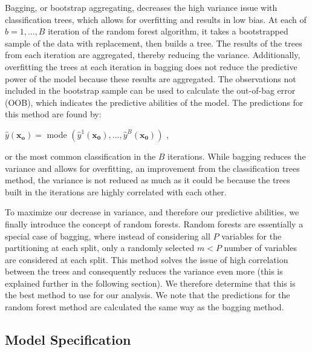 \documentclass{svproc}
\begin{document}
Bagging, or bootstrap aggregating, decreases the high variance issue with classification trees, which allows for overfitting and results in low bias. At each of $b=1,...,B$ iteration of the random forest algorithm, it takes a bootstrapped sample of the data with replacement, then builds a tree. The results of the trees from each iteration are aggregated, thereby reducing the variance. Additionally, overfitting the trees at each iteration in bagging does not reduce the predictive power of the model because these results are aggregated. The observations not included in the bootstrap sample can be used to calculate the out-of-bag error (OOB), which indicates the predictive abilities of the model. The predictions for this method are found by:

\begin{center}
$\hat{y}(\mathbf{x_o}) = $ mode $(\hat{y}^1(\mathbf{x_0}),...,\hat{y}^B(\mathbf{x_0}))$ ,
\end{center}

or the most common classification in the $B$ iterations. While bagging reduces the variance and allows for overfitting, an improvement from the classification trees method, the variance is not reduced as much as it could be because the trees built in the iterations are highly correlated with each other. 

To maximize our decrease in variance, and therefore our predictive abilities, we finally introduce the concept of random forests. Random forests are essentially a special case of bagging, where instead of considering all $P$ variables for the partitioning at each split, only a randomly selected $m<P$ number of variables are considered at each split. This method solves the issue of high correlation between the trees and consequently reduces the variance even more (this is explained further in the following section). We therefore determine that this is the best method to use for our analysis. We note that the predictions for the random forest method are calculated the same way as the bagging method. 

\subsection{Model Specification}
\end{document}
